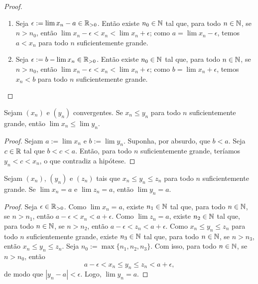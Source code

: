\begin{proof}
    \leavevmode
        \begin{enumerate}[leftmargin=*, align=left, label=\textbf{(\alph*)}]
            \item Seja $\epsilon := \lim x_n - a \in \mathbb{R}_{>0}$. Então existe $n_0 \in \mathbb{N}$ tal que, para todo $n \in \mathbb{N}$, se $n > n_0$, então $\lim x_n - \epsilon < x_n < \lim x_n + \epsilon$; como $a = \lim x_n - \epsilon$, temos $a < x_n$ para todo $n$ suficientemente grande. \blackproof
            \item Seja $\epsilon := b - \lim x_n \in \mathbb{R}_{>0}$. Então existe $n_0 \in \mathbb{N}$ tal que, para todo $n \in \mathbb{N}$, se $n > n_0$, então $\lim x_n - \epsilon < x_n < \lim x_n + \epsilon$; como $b = \lim x_n + \epsilon$, temos $x_n < b$ para todo $n$ suficientemente grande. \blackproof
        \end{enumerate}
\end{proof}

\begin{corollary}
    Sejam $(x_n)$ e $(y_n)$ convergentes. Se $x_n \leq y_n$ para todo $n$ suficientemente grande, então $\lim x_n \leq \lim y_n$.
\end{corollary}

\begin{proof}
    Sejam $a := \lim x_n$ e $b := \lim y_n$. Suponha, por absurdo, que $b < a$. Seja $c \in \mathbb{R}$ tal que $b < c < a$. Então, para todo $n$ suficientemente grande, teríamos $y_n < c < x_n$, o que contradiz a hipótese. \blackproof
\end{proof}

\begin{theorem}[Confronto]
    Sejam $(x_n)$, $(y_n)$ e $(z_n)$ tais que $x_n \leq y_n \leq z_n$ para todo $n$ suficientemente grande. Se $\lim x_n = a$ e $\lim z_n = a$, então $\lim y_n = a$.
\end{theorem}

\begin{proof}
    Seja $\epsilon \in \mathbb{R}_{>0}$. Como $\lim x_n = a$, existe $n_1 \in \mathbb{N}$ tal que, para todo $n \in \mathbb{N}$, se $n > n_1$, então $a-\epsilon < x_n < a+\epsilon$. Como $\lim z_n = a$, existe $n_2 \in \mathbb{N}$ tal que, para todo $n \in \mathbb{N}$, se $n > n_2$, então $a-\epsilon < z_n < a+\epsilon$. Como $x_n \leq y_n \leq z_n$ para todo $n$ suficientemente grande, existe $n_3 \in \mathbb{N}$ tal que, para todo $n \in \mathbb{N}$, se $n > n_3$, então $x_n \leq y_n \leq z_n$. Seja $n_0 := \max \{n_1, n_2, n_3 \}$. Com isso, para todo $n \in \mathbb{N}$, se $n > n_0$, então 
        \[
            a-\epsilon < x_n \leq y_n \leq z_n < a+\epsilon,
        \]
    de modo que $|y_n - a| < \epsilon$. Logo, $\lim y_n = a$. \blackproof
\end{proof}

